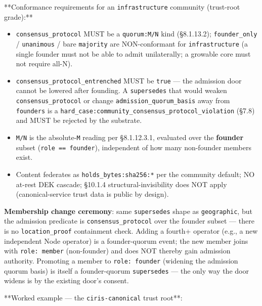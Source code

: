 \documentclass[11pt]{article}
\begin{document}
**Conformance requirements for an \texttt{infrastructure} community (trust-root grade):**


\begin{itemize}\setlength\itemsep{0pt}
\item \texttt{consensus\_protocol} MUST be a \texttt{quorum:M/N} kind (§8.1.13.2); \texttt{founder\_only} / \texttt{unanimous} / bare \texttt{majority} are NON-conformant for \texttt{infrastructure} (a single founder must not be able to admit unilaterally; a growable core must not require all-N).
\item \texttt{consensus\_protocol\_entrenched} MUST be \texttt{true} — the admission door cannot be lowered after founding. A \texttt{supersedes} that would weaken \texttt{consensus\_protocol} or change \texttt{admission\_quorum\_basis} away from \texttt{founders} is a \texttt{hard\_case:community\_consensus\_protocol\_violation} (§7.8) and MUST be rejected by the substrate.
\item \texttt{M/N} is the absolute-\texttt{M} reading per §8.1.12.3.1, evaluated over the \textbf{founder} subset (\texttt{role == founder}), independent of how many non-founder members exist.
\item Content federates as \texttt{holds\_bytes:sha256:*} per the community default; NO at-rest DEK cascade; §10.1.4 structural-invisibility does NOT apply (canonical-service trust data is public by design).
\end{itemize}


\textbf{Membership change ceremony}: same \texttt{supersedes} shape as \texttt{geographic}, but the admission predicate is \texttt{consensus\_protocol} over the founder subset — there is no \texttt{location\_proof} containment check. Adding a fourth+ operator (e.g., a new independent Node operator) is a founder-quorum event; the new member joins with \texttt{role: member} (non-founder) and does NOT thereby gain admission authority. Promoting a member to \texttt{role: founder} (widening the admission quorum basis) is itself a founder-quorum \texttt{supersedes} — the only way the door widens is by the existing door's consent.


**Worked example — the \texttt{ciris-canonical} trust root**:
\end{document}
